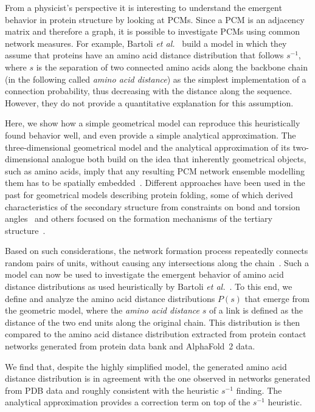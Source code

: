 \documentclass[
reprint,
twocolumn,
amsmath,amssymb,superscriptaddress,aps,
pre]{revtex4-1}
\begin{document}
From a physicist's perspective it is interesting to understand the emergent behavior in protein structure by looking at PCMs. Since a PCM is an adjacency matrix and therefore a graph, it is possible to investigate PCMs using common network measures. For example, Bartoli \textit{et al.}~\cite{bartoli2008effecta} build a model in which they assume that proteins have an amino acid distance distribution that follows $s^{-1}$, where $s$ is the separation of two connected amino acids along the backbone chain (in the following called \emph{amino acid distance}) as the simplest implementation of a connection probability, thus decreasing with the distance along the sequence. However, they do not provide a quantitative explanation for this assumption. 

Here, we show how a simple geometrical model can reproduce this heuristically found behavior well, and even provide a simple analytical approximation. The three-dimensional geometrical model and the analytical approximation of its two-dimensional analogue both build on the idea that inherently geometrical objects, such as amino acids, imply that any resulting PCM network ensemble modelling them has to be spatially embedded~\cite{molkenthin2016scaling, molkenthin2020self}. 
Different approaches have been used in the past for geometrical models describing protein folding, some of which derived characteristics of the secondary structure from constraints on bond and torsion angles~\cite{bhattacharjee2013flory,Danielsson2010,Molkenthin2011} and others focused on the formation mechanisms of the tertiary structure~\cite{molkenthin2016scaling, molkenthin2020self}. 

Based on such considerations, the network formation process repeatedly connects random pairs of units, without causing any intersections along the chain~\cite{molkenthin2016scaling}. Such a model can now be used to investigate the emergent behavior of amino acid distance distributions as used heuristically by Bartoli \textit{et al.}~\cite{bartoli2008effecta}. To this end, we define and analyze the amino acid distance distributions $P(s)$ that emerge from the geometric model, where the \emph{amino acid distance} $s$ of a link is defined as the distance of the two end units along the original chain. This distribution is then compared to the amino acid distance distribution extracted from protein contact networks generated from protein data bank and AlphaFold~2 data. 

We find that, despite the highly simplified model, the generated amino acid distance distribution is in agreement with the one observed in networks generated from PDB data and roughly consistent with the heuristic $s^{-1}$ finding. The analytical approximation provides a correction term on top of the $s^{-1}$ heuristic.
\end{document}
